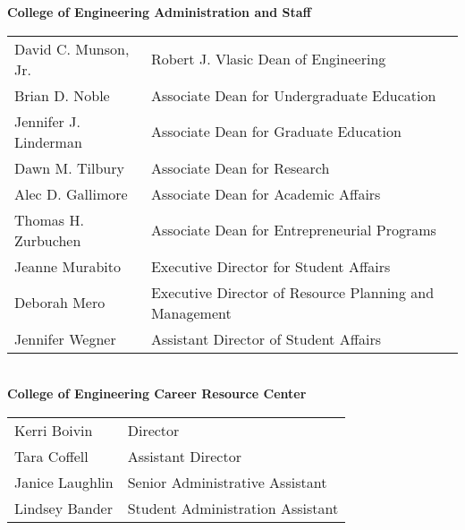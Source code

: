 \documentclass[twoside]{article}
\begin{document}
    { \fontsize{14}{17}\selectfont \bf College of Engineering Administration and Staff}\\\begin{tabular}{p{2in}l}
    David C. Munson, Jr.	&	Robert J. Vlasic Dean of Engineering\\
        Brian D. Noble	&	Associate Dean for Undergraduate Education\\
        Jennifer J. Linderman	&	Associate Dean for Graduate Education\\
        Dawn M. Tilbury	&	Associate Dean for Research\\
        Alec D. Gallimore	&	Associate Dean for Academic Affairs\\
        Thomas H. Zurbuchen	&	Associate Dean for Entrepreneurial Programs\\
        Jeanne  Murabito	&	Executive Director for Student Affairs\\
        Deborah Mero	&	Executive Director of Resource Planning and Management\\
        Jennifer Wegner	&	Assistant Director of Student Affairs\\
        \end{tabular}\\[1em]
    
    { \fontsize{14}{17}\selectfont \bf College of Engineering Career Resource Center}\\\begin{tabular}{p{2in}l}
    Kerri Boivin	&	Director\\
        Tara Coffell	&	Assistant Director\\
        Janice Laughlin	&	Senior Administrative Assistant\\
        Lindsey Bander	&	Student Administration Assistant\\
        \end{tabular}\\[1em]
    
\end{document}

